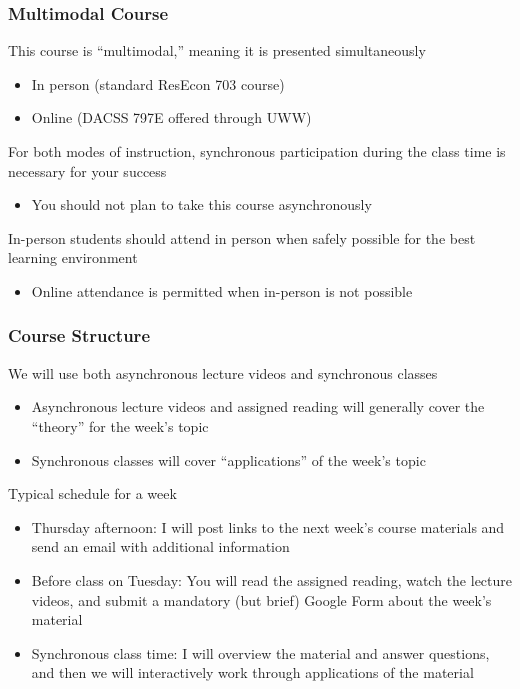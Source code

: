 \documentclass{beamer}
\begin{document}
\begin{frame}\frametitle{Multimodal Course}
    This course is ``multimodal,'' meaning it is presented simultaneously
    \begin{itemize}
        \item In person (standard ResEcon 703 course)
        \item Online (DACSS 797E offered through UWW)
    \end{itemize}
    \vspace{3ex}
    For both modes of instruction, synchronous participation during the class time is necessary for your success
    \begin{itemize}
        \item You should not plan to take this course asynchronously
    \end{itemize}
    \vspace{3ex}
    In-person students should attend in person when safely possible for the best learning environment
    \begin{itemize}
        \item Online attendance is permitted when in-person is not possible
    \end{itemize}
\end{frame}

\begin{frame}\frametitle{Course Structure}
    We will use both asynchronous lecture videos and synchronous classes
    \begin{itemize}
        \item Asynchronous lecture videos and assigned reading will generally cover the ``theory'' for the week's topic
        \item Synchronous classes will cover ``applications'' of the week's topic
    \end{itemize}
    \vspace{2ex}
    Typical schedule for a week
    \begin{itemize}
        \item Thursday afternoon: I will post links to the next week's course materials and send an email with additional information
        \item Before class on Tuesday: You will read the assigned reading, watch the lecture videos, and submit a mandatory (but brief) Google Form about the week's material
        \item Synchronous class time: I will overview the material and answer questions, and then we will interactively work through applications of the material
    \end{itemize}
\end{frame}
\end{document}
